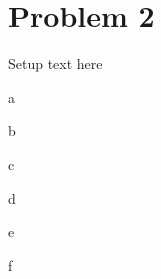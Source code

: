 \documentclass{article}
\begin{document}
\newpage
\section*{Problem 2}
Setup text here

\begin{problem}{a}
\end{problem}
\begin{solution}
\end{solution}

\begin{problem}{b}
\end{problem}
\begin{solution}
\end{solution}

\begin{problem}{c}
\end{problem}
\begin{solution}
\end{solution}

\begin{problem}{d}
\end{problem}
\begin{solution}
\end{solution}

\begin{problem}{e}
\end{problem}
\begin{solution}
\end{solution}

\begin{problem}{f}
\end{problem}
\begin{solution}
\end{solution}
\end{document}
